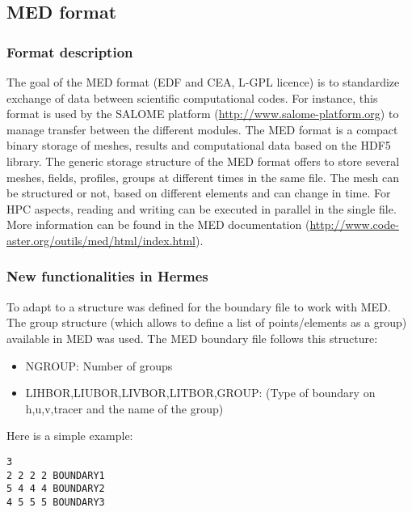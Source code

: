 \subsection{MED format}
%
\subsubsection{Format description}
%
The goal of the MED format (EDF and CEA, L-GPL licence) is to standardize
exchange of data between scientific computational codes. For instance, this
format is used by the SALOME platform (\url{http://www.salome-platform.org})
to manage transfer between the different modules. The MED format is a compact
binary storage of meshes, results and computational data based on the HDF5
library. The generic storage structure of the MED format offers to store
several meshes, fields, profiles, groups at different times in the same file.
The mesh can be structured or not, based on different elements and can change
in time. For HPC aspects, reading and writing can be executed in parallel in
the single file. More information can be found in the MED documentation
(\url{http://www.code-aster.org/outils/med/html/index.html}).
%
\subsubsection{New functionalities in Hermes}
%
To adapt to \telemacsystem a structure was defined for the boundary file to work with
MED. The group structure (which allows to define a list of points/elements as a
group) available in MED was used. The MED boundary file follows this structure:
\begin{itemize}
\item NGROUP: Number of groups
\item LIHBOR,LIUBOR,LIVBOR,LITBOR,GROUP: (Type of boundary on h,u,v,tracer and
the name of the group)
\end{itemize}
%
Here is a simple example:
\begin{verbatim}
3
2 2 2 2 BOUNDARY1
5 4 4 4 BOUNDARY2
4 5 5 5 BOUNDARY3
\end{verbatim}

%
